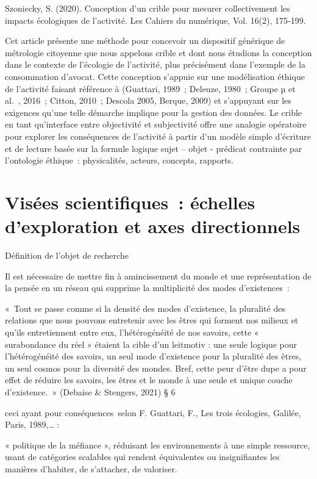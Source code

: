 \documentclass[
  letterpaper,
  DIV=11,
  numbers=noendperiod]{scrreprt}
\begin{document}
Szoniecky, S. (2020). Conception d'un crible pour mesurer collectivement
les impacts écologiques de l'activité. Les Cahiers du numérique, Vol.
16(2), 175‑199.

Cet article présente une méthode pour concevoir un dispositif générique
de métrologie citoyenne que nous appelons crible et dont nous étudions
la conception dans le contexte de l'écologie de l'activité, plus
précisément dans l'exemple de la consommation d'avocat. Cette conception
s'appuie sur une modélisation éthique de l'activité faisant référence à
(Guattari, 1989~; Deleuze, 1980~; Groupe µ et al.~, 2016~; Citton,
2010~; Descola 2005, Berque, 2009) et s'appuyant sur les exigences
qu'une telle démarche implique pour la gestion des données. Le crible en
tant qu'interface entre objectivité et subjectivité offre une analogie
opératoire pour explorer les conséquences de l'activité à partir d'un
modèle simple d'écriture et de lecture basée sur la formule logique
sujet -- objet - prédicat contrainte par l'ontologie éthique~:
physicalités, acteurs, concepts, rapports.

\hypertarget{sec-visees}{%
\chapter{Visées scientifiques~: échelles d'exploration et axes
directionnels}\label{sec-visees}}

Définition de l'objet de recherche

Il est nécessaire de mettre fin à amincissement du monde et une
représentation de la pensée en un réseau qui supprime la multiplicité
des modes d'existences~:

«~Tout se passe comme si la densité des modes d'existence, la pluralité
des relations que nous pouvons entretenir avec les êtres qui forment nos
milieux et qu'ils entretiennent entre eux, l'hétérogénéité de nos
savoirs, cette « surabondance du réel » étaient la cible d'un leitmotiv
: une seule logique pour l'hétérogénéité des savoirs, un seul mode
d'existence pour la pluralité des êtres, un seul cosmos pour la
diversité des mondes. Bref, cette peur d'être dupe a pour effet de
réduire les savoirs, les êtres et le monde à une seule et unique couche
d'existence.~» (Debaise \& Stengers, 2021) § 6

ceci ayant pour conséquences~selon F. Guattari, F., Les trois écologies,
Galilée, Paris, 1989,\ldots{} :

« politique de la méfiance », réduisant les environnements à une simple
ressource, usant de catégories scalables qui rendent équivalentes ou
insignifiantes les manières d'habiter, de s'attacher, de valoriser.
\end{document}
